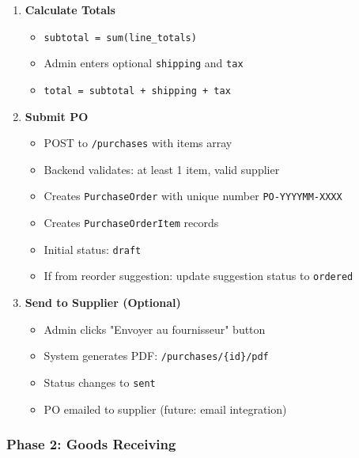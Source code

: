 \begin{enumerate}[leftmargin=*]
    \item \textbf{Calculate Totals}
    \begin{itemize}
        \item \texttt{subtotal = sum(line\_totals)}
        \item Admin enters optional \texttt{shipping} and \texttt{tax}
        \item \texttt{total = subtotal + shipping + tax}
    \end{itemize}
    
    \item \textbf{Submit PO}
    \begin{itemize}
        \item POST to \texttt{/purchases} with items array
        \item Backend validates: at least 1 item, valid supplier
        \item Creates \texttt{PurchaseOrder} with unique number \texttt{PO-YYYYMM-XXXX}
        \item Creates \texttt{PurchaseOrderItem} records
        \item Initial status: \texttt{draft}
        \item If from reorder suggestion: update suggestion status to \texttt{ordered}
    \end{itemize}
    
    \item \textbf{Send to Supplier (Optional)}
    \begin{itemize}
        \item Admin clicks "Envoyer au fournisseur" button
        \item System generates PDF: \texttt{/purchases/\{id\}/pdf}
        \item Status changes to \texttt{sent}
        \item PO emailed to supplier (future: email integration)
    \end{itemize}
\end{enumerate}

\subsubsection{Phase 2: Goods Receiving}


